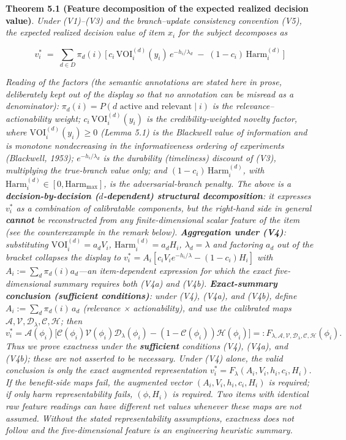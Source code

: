 \documentclass[
  11pt]{article}
\begin{document}
\textbf{Theorem 5.1 (Feature decomposition of the expected realized
decision value)}. \emph{Under (V1)--(V3) and the branch--update
consistency convention (V5), the expected realized decision value of
item \(x_i\) for the subject decomposes as}

\[v_i^* \;=\; \sum_{d \in D} \pi_d(i)\,\Big[\, c_i\,\mathrm{VOI}_i^{(d)}(y_i)\,e^{-h_i/\lambda_d} \;-\; (1 - c_i)\,\mathrm{Harm}_i^{(d)} \,\Big]\]

\emph{Reading of the factors (the semantic annotations are stated here
in prose, deliberately kept out of the display so that no annotation can
be misread as a denominator):}
\(\pi_d(i) = P(d \text{ active and relevant} \mid i)\) \emph{is the
relevance--actionability weight; \(c_i\,\mathrm{VOI}_i^{(d)}(y_i)\) is
the credibility-weighted novelty factor, where
\(\mathrm{VOI}_i^{(d)}(y_i) \ge 0\) (Lemma 5.1) is the Blackwell value
of information and is monotone nondecreasing in the informativeness
ordering of experiments (Blackwell, 1953); \(e^{-h_i/\lambda_d}\) is the
durability (timeliness) discount of (V3), multiplying the true-branch
value only; and \((1-c_i)\,\mathrm{Harm}_i^{(d)}\), with
\(\mathrm{Harm}_i^{(d)} \in [0, \mathrm{Harm}_{\max}]\), is the
adversarial-branch penalty. The above is a \textbf{decision-by-decision
(\(d\)-dependent) structural decomposition}: it expresses \(v_i^*\) as a
combination of calibratable components, but the right-hand side in
general \textbf{cannot} be reconstructed from any finite-dimensional
scalar feature of the item (see the counterexample in the remark below).
\textbf{Aggregation under (V4)}: substituting
\(\mathrm{VOI}_i^{(d)} = a_d V_i\), \(\mathrm{Harm}_i^{(d)} = a_d H_i\),
\(\lambda_d = \lambda\) and factoring \(a_d\) out of the bracket
collapses the display to
\(v_i^* = A_i[c_iV_ie^{-h_i/\lambda} - (1-c_i)H_i]\) with
\(A_i := \sum_d \pi_d(i)a_d\)---an item-dependent expression for which
the exact five-dimensional summary requires both (V4a) and (V4b).
\textbf{Exact-summary conclusion (sufficient conditions)}: under (V4),
(V4a), and (V4b), define \(A_i := \sum_d \pi_d(i)\,a_d\) (relevance ×
actionability), and use the calibrated maps
\(\mathcal A,\mathcal V,\mathcal D_\lambda,\mathcal C,\mathcal H\);
then}
\[v_i^*=\mathcal A(\phi_i)\Big[\mathcal C(\phi_i)\mathcal V(\phi_i)\mathcal D_\lambda(\phi_i)-(1-\mathcal C(\phi_i))\mathcal H(\phi_i)\Big]=:F_{\lambda,\mathcal A,\mathcal V,\mathcal D_\lambda,\mathcal C,\mathcal H}(\phi_i).\]
\emph{Thus we prove exactness under the \textbf{sufficient} conditions
(V4), (V4a), and (V4b); these are not asserted to be necessary. Under
(V4) alone, the valid conclusion is only the exact augmented
representation \(v_i^*=F_\lambda(A_i,V_i,h_i,c_i,H_i)\). If the
benefit-side maps fail, the augmented vector \((A_i,V_i,h_i,c_i,H_i)\)
is required; if only harm representability fails, \((\phi,H_i)\) is
required. Two items with identical raw feature readings can have
different net values whenever these maps are not assumed. Without the
stated representability assumptions, exactness does not follow and the
five-dimensional feature is an engineering heuristic summary.}
\end{document}
